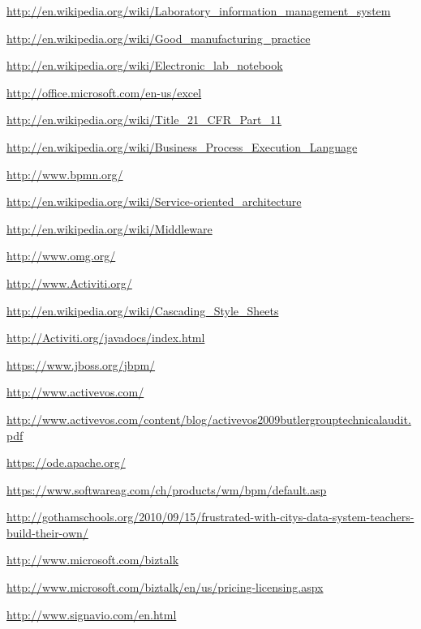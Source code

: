 \documentclass[paper=a4,twoside=false,BCOR=0mm,DIV=calc,fontsize=12pt]{scrartcl}
\begin{document}
\begin{thebibliography}{99}

 \url{http://en.wikipedia.org/wiki/Laboratory_information_management_system}

 \url{}

 \url{http://en.wikipedia.org/wiki/Good_manufacturing_practice}

 \url{http://en.wikipedia.org/wiki/Electronic_lab_notebook}

 \url{http://office.microsoft.com/en-us/excel}

 \url{http://en.wikipedia.org/wiki/Title_21_CFR_Part_11}

 \url{http://en.wikipedia.org/wiki/Business_Process_Execution_Language}

 \url{http://www.bpmn.org/}

 \url{http://en.wikipedia.org/wiki/Service-oriented_architecture}

 \url{http://en.wikipedia.org/wiki/Middleware}

 \url{http://www.omg.org/}

 \url{http://www.Activiti.org/}

 \url{http://en.wikipedia.org/wiki/Cascading_Style_Sheets}

 \url{http://Activiti.org/javadocs/index.html}

 \url{https://www.jboss.org/jbpm/}

 \url{http://www.activevos.com/}

 \url{http://www.activevos.com/content/blog/activevos2009butlergrouptechnicalaudit.pdf}

 \url{https://ode.apache.org/}

 \url{https://www.softwareag.com/ch/products/wm/bpm/default.asp}

 \url{http://gothamschools.org/2010/09/15/frustrated-with-citys-data-system-teachers-build-their-own/}

 \url{http://www.microsoft.com/biztalk}

 \url{http://www.microsoft.com/biztalk/en/us/pricing-licensing.aspx}

 \url{http://www.signavio.com/en.html}


\end{thebibliography}
\end{document}
